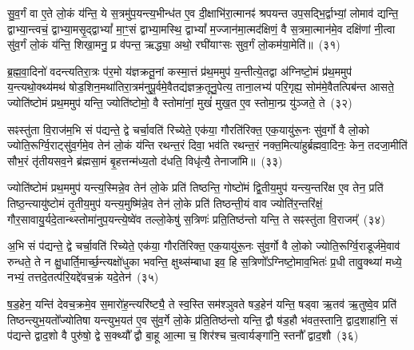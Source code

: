 {\anuvakamend[{ए॒तच्छ॒म्बट्कु॑र्वन्ति॒ तेषा॒ञ्चतु॑स्त्रिꣳशच्च}]}

सु॒व॒र्गं वा ए॒ते लो॒कं य॑न्ति॒ ये स॒त्रमु॑प॒यन्त्य॒भीन्ध॑त ए॒व दी॒क्षाभि॑रा॒त्मानꣴ॑ श्रपयन्त उप॒सद्भि॒र्द्वाभ्यां॒ लोमाव॑ द्यन्ति॒ द्वाभ्या॒न्त्वचं॒ द्वाभ्या॒मसृ॒द्द्वाभ्यां᳚ मा॒ꣳ॒सं द्वाभ्या॒मस्थि॒ द्वाभ्यां᳚ म॒ज्जान॑मा॒त्मद॑क्षिणं॒ वै स॒त्रमा॒त्मान॑मे॒व दक्षि॑णां नी॒त्वा सु॑व॒र्गं लो॒कं य॑न्ति॒ शिखा॒मनु॒ प्र व॑पन्त॒ ऋद्ध्या॒ अथो॒ रघी॑याꣳसः सुव॒र्गं लो॒कम॑या॒मेति॑॥~(३१)\ip

{\anuvakamend[{सु॒व॒र्गं प॑ञ्चा॒शत्}]}

ब्र॒ह्म॒वा॒दिनो॑ वदन्त्यतिरा॒त्रः प॑र॒मो य॑ज्ञक्रतू॒नां कस्मा॒त्तं प्र॑थ॒ममुप॑ य॒न्तीत्ये॒तद्वा अ॑ग्निष्टो॒मं प्र॑थ॒ममुप॑ य॒न्त्यथो॒क्थ्य॑मथ॑ षोड॒शिन॒मथा॑तिरा॒त्रम॑नुपू॒र्वमे॒वैतद्य॑ज्ञक्र॒तूनु॒पेत्य॒ ताना॒लभ्य॑ परि॒गृह्य॒ सोम॑मे॒वैतत्पिब॑न्त आसते॒ ज्योति॑ष्टोमं प्रथ॒ममुप॑ यन्ति॒ ज्योति॑ष्टोमो॒ वै स्तोमा॑नां॒ मुखं॑ मुख॒त ए॒व स्तोमा॒न्प्र यु॑ञ्जते॒ ते~(३२)\ip

सꣴस्तु॑ता वि॒राज॑म॒भि सं प॑द्यन्ते॒ द्वे चर्चा॒वति॑ रिच्येते॒ एक॑या॒ गौरति॑रिक्त॒ एक॒यायु॑रू॒नः सु॑व॒र्गो वै लो॒को ज्योति॒रूर्ग्वि॒राट्सु॑व॒र्गमे॒व तेन॑ लो॒कं य॑न्ति रथन्त॒रं दिवा॒ भव॑ति रथन्त॒रं नक्त॒मित्या॑हुर्ब्रह्मवा॒दिनः॒ केन॒ तदजा॒मीति॑ सौभ॒रं तृ॑तीय\-सव॒ने ब्र॑ह्मसा॒मं बृ॒हत्तन्म॑ध्य॒तो द॑धति॒ विधृ॑त्यै॒ तेनाजा॑मि॥~(३३)\ip

{\anuvakamend[{त एका॒न्नप॑ञ्चा॒शच्च॑}]}%

ज्योति॑ष्टोमं प्रथ॒ममुप॑ यन्त्य॒स्मिन्ने॒व तेन॑ लो॒के प्रति॑ तिष्ठन्ति॒ गोष्टो॑मं द्वि॒तीय॒मुप॑ यन्त्य॒न्तरि॑क्ष ए॒व तेन॒ प्रति॑ तिष्ठ॒न्त्यायु॑ष्टोमं तृ॒तीय॒मुप॑ यन्त्य॒मुष्मि॑न्ने॒व तेन॑ लो॒के प्रति॑ तिष्ठन्ती॒यं वाव ज्योति॑र॒न्तरि॑क्षं॒ गौर॒सावायु॒र्यदे॒तान्थ्स्तोमा॑नुप॒यन्त्ये॒ष्वे॑व तल्लो॒केषु॑ स॒त्रिणः॑ प्रति॒तिष्ठ॑न्तो यन्ति॒ ते सꣴस्तु॑ता वि॒राजम्᳚~(३४)\ip

अ॒भि सं प॑द्यन्ते॒ द्वे चर्चा॒वति॑ रिच्येते॒ एक॑या॒ गौरति॑रिक्त॒ एक॒यायु॑रू॒नः सु॑व॒र्गो वै लो॒को ज्योति॒रूर्ग्वि॒राडूर्ज॑मे॒वाव॑ रुन्धते॒ ते न क्षु॒धार्ति॒मार्च्छ॒न्त्यक्षो॑धुका भवन्ति॒ क्षुथ्स॑म्बाधा इव॒ हि स॒त्रिणो᳚\-ऽग्निष्टो॒माव॒भितः॑ प्र॒धी तावु॒क्थ्या॑ मध्ये॒ नभ्यं॒ तत्तदे॒तत्प॑रि॒यद्दे॑वच॒क्रं यदे॒तेन॑~(३५)\ip

ष॒ड॒हेन॒ यन्ति॑ देवच॒क्रमे॒व स॒मारो॑ह॒न्त्यरि॑ष्ट्यै॒ ते स्व॒स्ति सम॑श्ञुवते षड॒हेन॑ यन्ति॒ षड्वा ऋ॒तव॑ ऋ॒तुष्वे॒व प्रति॑ तिष्ठन्त्युभ॒यतो᳚ज्योतिषा यन्त्युभ॒यत॑ ए॒व सु॑व॒र्गे लो॒के प्र॑ति॒तिष्ठ॑न्तो यन्ति॒ द्वौ ष॑ड॒हौ भ॑वत॒स्तानि॒ द्वाद॒शाहा॑नि॒ सं प॑द्यन्ते द्वाद॒शो वै पुरु॑षो॒ द्वे स॒क्थ्यौ᳚ द्वौ बा॒हू आ॒त्मा च॒ शिर॑श्च च॒त्वार्यङ्गा॑नि॒ स्तनौ᳚ द्वाद॒शौ~(३६)\ip

